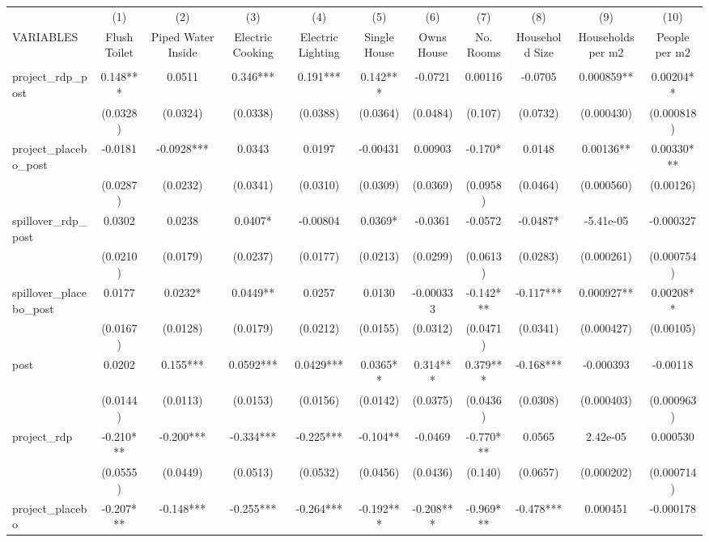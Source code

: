 \begin{tabular}{lcccccccccc} \hline
 & (1) & (2) & (3) & (4) & (5) & (6) & (7) & (8) & (9) & (10) \\
VARIABLES & Flush Toilet & Piped Water Inside & Electric Cooking & Electric Lighting & Single House & Owns House & No. Rooms & Household Size & Households per m2 & People per m2 \\ \hline
 &  &  &  &  &  &  &  &  &  &  \\
project\_rdp\_post & 0.148*** & 0.0511 & 0.346*** & 0.191*** & 0.142*** & -0.0721 & 0.00116 & -0.0705 & 0.000859** & 0.00204** \\
 & (0.0328) & (0.0324) & (0.0338) & (0.0388) & (0.0364) & (0.0484) & (0.107) & (0.0732) & (0.000430) & (0.000818) \\
project\_placebo\_post & -0.0181 & -0.0928*** & 0.0343 & 0.0197 & -0.00431 & 0.00903 & -0.170* & 0.0148 & 0.00136** & 0.00330*** \\
 & (0.0287) & (0.0232) & (0.0341) & (0.0310) & (0.0309) & (0.0369) & (0.0958) & (0.0464) & (0.000560) & (0.00126) \\
spillover\_rdp\_post & 0.0302 & 0.0238 & 0.0407* & -0.00804 & 0.0369* & -0.0361 & -0.0572 & -0.0487* & -5.41e-05 & -0.000327 \\
 & (0.0210) & (0.0179) & (0.0237) & (0.0177) & (0.0213) & (0.0299) & (0.0613) & (0.0283) & (0.000261) & (0.000754) \\
spillover\_placebo\_post & 0.0177 & 0.0232* & 0.0449** & 0.0257 & 0.0130 & -0.000333 & -0.142*** & -0.117*** & 0.000927** & 0.00208** \\
 & (0.0167) & (0.0128) & (0.0179) & (0.0212) & (0.0155) & (0.0312) & (0.0471) & (0.0341) & (0.000427) & (0.00105) \\
post & 0.0202 & 0.155*** & 0.0592*** & 0.0429*** & 0.0365** & 0.314*** & 0.379*** & -0.168*** & -0.000393 & -0.00118 \\
 & (0.0144) & (0.0113) & (0.0153) & (0.0156) & (0.0142) & (0.0375) & (0.0436) & (0.0308) & (0.000403) & (0.000963) \\
project\_rdp & -0.210*** & -0.200*** & -0.334*** & -0.225*** & -0.104** & -0.0469 & -0.770*** & 0.0565 & 2.42e-05 & 0.000530 \\
 & (0.0555) & (0.0449) & (0.0513) & (0.0532) & (0.0456) & (0.0436) & (0.140) & (0.0657) & (0.000202) & (0.000714) \\
project\_placebo & -0.207*** & -0.148*** & -0.255*** & -0.264*** & -0.192*** & -0.208*** & -0.969*** & -0.478*** & 0.000451 & -0.000178 \\

\end{tabular}
